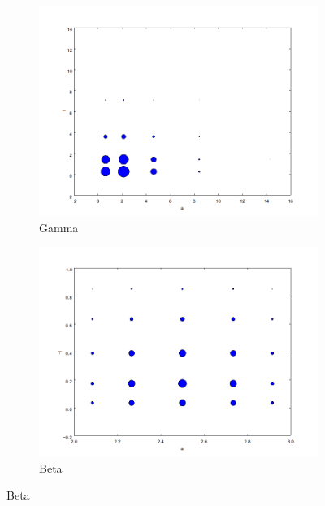\documentclass{beamer}
\begin{document}
\begin{frame}
\begin{figure}
\begin{subfigure}[b]{0.37\textwidth}
                \includegraphics[width=\textwidth]{nodes_gamma.png}
                \caption{Gamma}
        \end{subfigure}%
 \begin{subfigure}[b]{0.37\textwidth}
                \includegraphics[width=\textwidth]{nodes_beta.png}
                \caption{Beta}
        \end{subfigure}
        \end{figure}
               
\end{frame}
 
\end{document}
